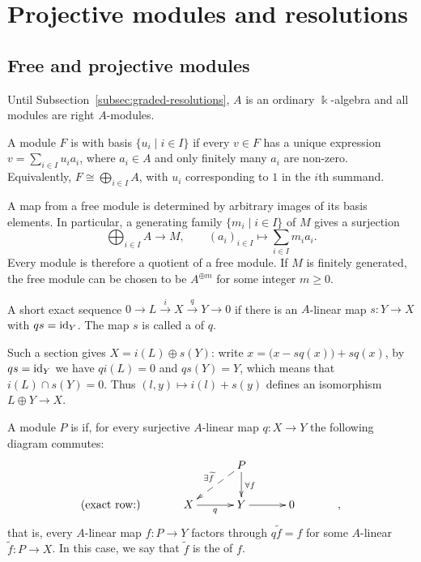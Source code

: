 \clearpage
\section{Projective modules and resolutions}\label{sec:minimal-resolutions}


\subsection{Free and projective modules}

Until Subsection~\ref{subsec:graded-resolutions}, $A$ is an ordinary $\Bbbk$-algebra and all modules are right $A$-modules.

\begin{definition}\label{def:free-module}
A module $F$ is  with basis $\{u_i\mid i\in I\}$ if every $v\in F$ has a unique expression $v=\sum_{i\in I}u_i a_i$, where $a_i\in A$ and only finitely many $a_i$ are non-zero.
Equivalently, $F\cong\bigoplus_{i\in I}A$, with $u_i$ corresponding to $1$ in the $i$th summand.
\end{definition}

A map from a free module is determined by arbitrary images of its basis elements.
In particular, a generating family $\{m_i\mid i\in I\}$ of $M$ gives a surjection
\[
\bigoplus_{i\in I}A\longrightarrow M,\qquad
(a_i)_{i\in I}\longmapsto\sum_{i\in I}m_i a_i.
\]
Every module is therefore a quotient of a free module. If $M$ is finitely generated, the free module can be chosen to be $A^{\oplus m}$ for some integer $m\geq0$.

\begin{definition}\label{def:split-sequence}
A short exact sequence $0\to L\xrightarrow{i}X\xrightarrow{q}Y\to0$  if there is an $A$-linear map $s:Y\to X$ with $qs=\operatorname{id}_Y$.
The map $s$ is called a  of $q$.
\end{definition}

Such a section gives $X=i(L)\oplus s(Y)$: write $x=\big(x-sq(x)\big)+sq(x)$, by $qs=\operatorname{id}_Y$ we have $qi(L)=0$ and $qs(Y)=Y$, which means that $i(L)\cap s(Y)=0$.
Thus $(l,y)\mapsto i(l)+s(y)$ defines an isomorphism $L\oplus Y\to X$.

\begin{definition}\label{def:projective-module}
A module $P$ is  if, for every surjective $A$-linear map $q:X\to Y$ the following diagram commutes:
\[
\xymatrix@C=32pt@R=20pt{
& & P\ar[d]^{\forall f}\ar@{-->}[dl]_{\exists \widetilde f}\\
\text{(exact row:)} & X\ar[r]_{
q} & Y\ar[r] & 0 & ,
}
\]
that is, every $A$-linear map $f:P\to Y$ factors through  $q\widetilde f=f$ for some $A$-linear $\widetilde f:P\to X$.
In this case, we say that $\widetilde{f}$ is the  of $f$.
\end{definition}

